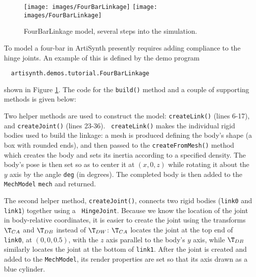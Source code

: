\begin{figure}[ht]
\begin{center}
\iflatexml
 \texttt{[image: images/FourBarLinkage]}
\else
 \texttt{[image: images/FourBarLinkage]}
\fi
\end{center}
\caption{FourBarLinkage model, several steps into the simulation.}
\label{FourBarLinkage:fig}
\end{figure}

To model a four-bar in ArtiSynth presently requires adding compliance
to the hinge joints. An example of this is defined by the demo program
%
\begin{verbatim}
  artisynth.demos.tutorial.FourBarLinkage
\end{verbatim}
%
shown in Figure \ref{FourBarLinkage:fig}.
The code for the {\tt build()} method and a couple of supporting
methods is given below:
\lstset{numbers=left}
\iflatexml
  
\else
  
\fi
\lstset{numbers=none}
Two helper methods are used to construct the model: {\tt createLink()}
(lines 6-17), and {\tt createJoint()} (lines 23-36).  {\tt
createLink()} makes the individual rigid bodies used to build the
linkage: a mesh is produced defining the body's shape (a box with
rounded ends), and then passed to the
{\tt createFromMesh()} method which creates the body and sets its
inertia according to a specified density. The body's pose is then set
so as to center it at $(x, 0, z)$ while rotating it about the $y$ axis
by the angle {\tt deg} (in degrees). The completed body is then added to the
{\tt MechModel} {\tt mech} and returned.

The second helper method, {\tt createJoint()}, connects two rigid
bodies ({\tt link0} and {\tt link1}) together using a {\tt
HingeJoint}. Because we know the location of the joint in
body-relative coordinates, it is easier to create the joint using the
transforms $\T_{CA}$ and $\T_{DB}$ instead of $\T_{DW}$: $\T_{CA}$
locates the joint at the top end of {\tt link0}, at $(0, 0, 0.5)$,
with the $z$ axis parallel to the body's $y$ axis, while $\T_{DB}$
similarly locates the joint at the bottom of {\tt link1}.  After the
joint is created and added to the {\tt MechModel}, its render
properties are set so that its axis drawn as a blue cylinder.

